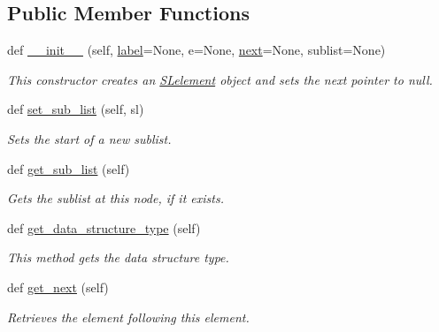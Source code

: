 \subsection*{Public Member Functions}
\begin{DoxyCompactItemize}
\item 
def \mbox{\hyperlink{class_bridges_1_1_m_lelement_1_1_m_lelement_adf7e1429b30cbd38b593e4266e795650}{\+\_\+\+\_\+init\+\_\+\+\_\+}} (self, \mbox{\hyperlink{class_bridges_1_1_element_1_1_element_a301fe5be8cf72b2c62f6a218feeb9166}{label}}=None, e=None, \mbox{\hyperlink{class_bridges_1_1_s_lelement_1_1_s_lelement_a650935f5a68b49de4c222cc4c8b0c778}{next}}=None, sublist=None)
\begin{DoxyCompactList}\small\item\em This constructor creates an \mbox{\hyperlink{namespace_bridges_1_1_s_lelement}{S\+Lelement}} object and sets the next pointer to null. \end{DoxyCompactList}\item 
def \mbox{\hyperlink{class_bridges_1_1_m_lelement_1_1_m_lelement_a621bc963cf3cd0638fe2bc887ad3d1b3}{set\+\_\+sub\+\_\+list}} (self, sl)
\begin{DoxyCompactList}\small\item\em Sets the start of a new sublist. \end{DoxyCompactList}\item 
def \mbox{\hyperlink{class_bridges_1_1_m_lelement_1_1_m_lelement_a6e90fc95e186efee921d6dfe1c4e9e94}{get\+\_\+sub\+\_\+list}} (self)
\begin{DoxyCompactList}\small\item\em Gets the sublist at this node, if it exists. \end{DoxyCompactList}\item 
def \mbox{\hyperlink{class_bridges_1_1_m_lelement_1_1_m_lelement_a9b7a6ee7ff5c9e7a57aa5e88983c0a8e}{get\+\_\+data\+\_\+structure\+\_\+type}} (self)
\begin{DoxyCompactList}\small\item\em This method gets the data structure type. \end{DoxyCompactList}\item 
def \mbox{\hyperlink{class_bridges_1_1_m_lelement_1_1_m_lelement_ad1bb911d71086b8b27cd4d76eebcde05}{get\+\_\+next}} (self)
\begin{DoxyCompactList}\small\item\em Retrieves the element following this element. \end{DoxyCompactList}\item 

\end{DoxyCompactItemize}
